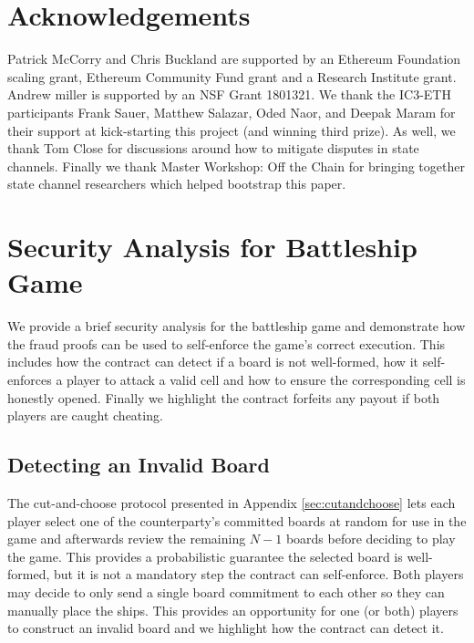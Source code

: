 \documentclass{llncs}
\begin{document}
	
	
	
	\section{Acknowledgements}
	
	Patrick McCorry and Chris Buckland are supported by an Ethereum Foundation scaling grant, Ethereum Community Fund grant and a Research Institute grant. 
	Andrew miller is supported by an NSF Grant 1801321.
	We thank the IC3-ETH participants Frank Sauer, Matthew Salazar, Oded Naor, and Deepak Maram for their support at kick-starting this project (and winning third prize).
	As well, we thank Tom Close for discussions around how to mitigate disputes in state channels. Finally we thank Master Workshop: Off the Chain for bringing together state channel researchers which helped bootstrap this paper. 
	
	
	
	\appendix
	
	
	
	\section{Security Analysis for Battleship Game} \label{sec:secanalysis}
	
	We provide a brief security analysis for the battleship game and demonstrate how the fraud proofs can be used to self-enforce the game's correct execution.
	This includes how the contract can detect if a board is not well-formed, how it self-enforces a player to attack a valid cell and how to ensure the corresponding cell is honestly opened. 
	Finally we highlight the contract forfeits any payout if both players are caught cheating. 
	
	\subsection{Detecting an Invalid Board}
	
	The cut-and-choose protocol presented in Appendix \ref{sec:cutandchoose} lets each player select one of the counterparty's committed boards at random for use in the game and afterwards review the remaining $N-1$ boards before deciding to play the game. 
	This provides a probabilistic guarantee the selected board is well-formed, but it is not a mandatory step the contract can self-enforce. 
	Both players may decide to only send a single board commitment to each other so they can manually place the ships. 
	This provides an opportunity for one (or both) players to construct an invalid board and we highlight how the contract can detect it.  
	
\end{document}
